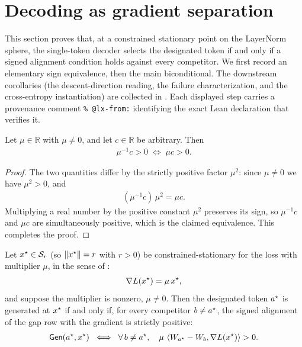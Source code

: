 \section{Decoding as gradient separation}
\label{sec:decode-iff}

This section proves that, at a constrained stationary point on the LayerNorm sphere, the
single-token decoder selects the designated token if and only if a signed alignment
condition holds against every competitor. We first record an elementary sign equivalence,
then the main biconditional. The downstream corollaries (the descent-direction reading, the
failure characterization, and the cross-entropy instantiation) are collected in
. Each displayed step carries a provenance comment
\verb|% @lx-from:| identifying the exact Lean declaration that verifies it.

\begin{lemma}
\label{lem:sign_equiv}
Let $\mu \in \mathbb{R}$ with $\mu \ne 0$, and let $c \in \mathbb{R}$ be arbitrary. Then %
\begin{align*}
\mu^{-1} c > 0 \;\iff\; \mu c > 0.
\end{align*}
\end{lemma}

\begin{proof}
The two quantities differ by the strictly positive factor $\mu^{2}$: since $\mu \ne 0$ we
have $\mu^{2} > 0$, and
\begin{align*}
(\mu^{-1} c)\,\mu^{2} = \mu c.
\end{align*}
Multiplying a real number by the positive constant $\mu^{2}$ preserves its sign, so
$\mu^{-1} c$ and $\mu c$ are simultaneously positive, which is the claimed equivalence. This
completes the proof.
\end{proof}

\begin{theorem}
\label{thm:main}
Let $x^{\star} \in \mathcal{S}_r$ (so $\left\| x^{\star} \right\| = r$ with $r > 0$) be constrained-stationary for
the loss with multiplier $\mu$, in the sense of :
\begin{align*}
\nabla L(x^{\star}) = \mu\,x^{\star},
\end{align*}
and suppose the multiplier is nonzero, $\mu \ne 0$. Then the designated token $a^{\star}$ is
generated at $x^{\star}$ if and only if, for every competitor $b \ne a^{\star}$, the signed
alignment of the gap row with the gradient is strictly positive:
\begin{align*}
\mathsf{Gen}(a^{\star}, x^{\star})
\;\iff\;
\forall\, b \ne a^{\star},\quad \mu\,\left\langle W_{a^{\star}} - W_{b}, \nabla L(x^{\star}) \right\rangle > 0.
\end{align*}
\end{theorem}

